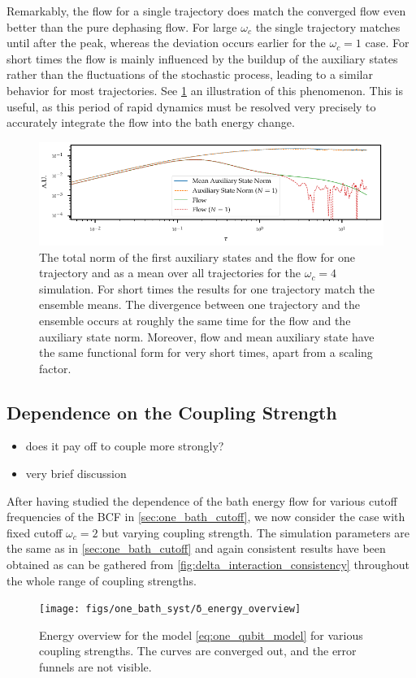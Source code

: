 Remarkably, the flow for a single trajectory does match the converged
flow even better than the pure dephasing flow. For large \(ω_{c}\) the
single trajectory matches until after the peak, whereas the deviation
occurs earlier for the \(ω_{c}=1\) case. For short times the flow is
mainly influenced by the buildup of the auxiliary states rather than
the fluctuations of the stochastic process, leading to a similar
behavior for most trajectories. See \cref{fig:flow_buildup} an
illustration of this phenomenon. This is useful, as this period of
rapid dynamics must be resolved very precisely to accurately integrate
the flow into the bath energy change.
\begin{figure}[h]
  \centering
  \includegraphics{figs/one_bath_syst/flow_buildup}
  \caption{\label{fig:flow_buildup} The total norm of the first
    auxiliary states and the flow for one trajectory and as a mean
    over all trajectories for the \(ω_{c}=4\) simulation. For short
    times the results for one trajectory match the ensemble means. The
    divergence between one trajectory and the ensemble occurs at
    roughly the same time for the flow and the auxiliary state
    norm. Moreover, flow and mean auxiliary state have the same
    functional form for very short times, apart from a scaling factor.}
\end{figure}

\subsection{Dependence on the Coupling Strength}
\label{sec:one_bathcoup_strength}
\begin{itemize}
\item does it pay off to couple more strongly?
\item very brief discussion
\end{itemize}
After having studied the dependence of the bath energy flow for
various cutoff frequencies of the BCF in \cref{sec:one_bath_cutoff},
we now consider the case with fixed cutoff \(ω_c=2\) but varying
coupling strength. The simulation parameters are the same as in
\cref{sec:one_bath_cutoff} and again consistent results have been
obtained as can be gathered from
\cref{fig:delta_interaction_consistency} throughout the whole range of
coupling strengths.
\begin{figure}[h]
  \centering
  \texttt{[image: figs/one\_bath\_syst/δ\_energy\_overview]}
  \caption{\label{fig:delta_energy_overview} Energy overview for the
    model \cref{eq:one_qubit_model} for various coupling
    strengths. The curves are converged out, and the error funnels are
    not visible.}
\end{figure}

